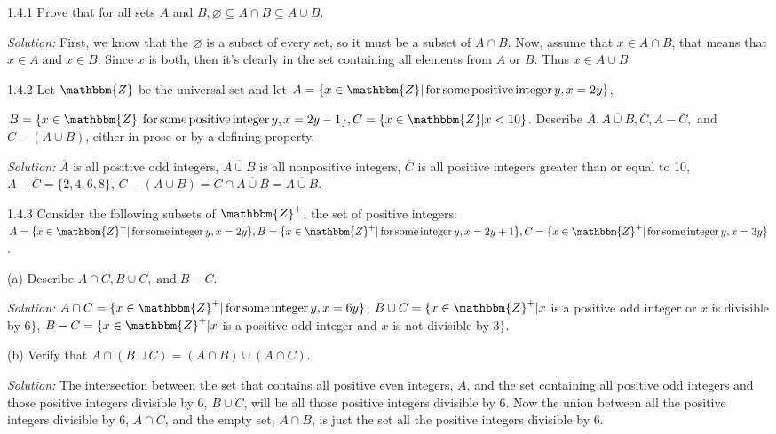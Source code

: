 \documentclass{letter}
\newcommand{\tmop}[1]{\ensuremath{\operatorname{#1}}}
\newcommand{\tmtextit}[1]{{\itshape{#1}}}
\begin{document}
1.4.1 Prove that for all sets $A$ and $B, \varnothing \subseteq A \cap B
\subseteq A \cup B$.

\tmtextit{Solution:} First, we know that the $\varnothing$ is a subset of
every set, so it must be a subset of $A \cap B$. Now, assume that $x \in A
\cap B$, that means that $x \in A \tmop{and} x \in B$. Since $x$ is both, then
it's clearly in the set containing all elements from $A$ or $B$. Thus $x \in A
\cup B$.

1.4.2 Let $\mathbbm{Z}$ be the universal set and let $A =\{x \in \mathbbm{Z}|
\tmop{for} \tmop{some} \tmop{positive} \tmop{integer} y, x = 2 y\}$,

$B =\{x \in \mathbbm{Z}| \tmop{for} \tmop{some} \tmop{positive} \tmop{integer}
y, x = 2 y - 1\}, C =\{x \in \mathbbm{Z}| x < 10\}$. Describe $\overline{A},
\overline{A \cup B}, \overline{C}, A - \overline{C},$ and $C - (A \cup B)$,
either in prose or by a defining property.

\tmtextit{Solution:} $\overline{A}$ is all positive odd integers, $\overline{A
\cup B}$ is all nonpositive integers, $\overline{C}$ is all positive integers
greater than or equal to 10, $A - \overline{C} =\{2, 4, 6, 8\}$, $C - (A \cup
B) = C \cap \overline{A \cup B} = \overline{A \cup B}$.

1.4.3 Consider the following subsets of $\mathbbm{Z}^+$, the set of positive
integers: $A =\{x \in \mathbbm{Z}^+ | \tmop{for} \tmop{some} \tmop{integer} y,
x = 2 y\}, B =\{x \in \mathbbm{Z}^+ | \tmop{for} \tmop{some} \tmop{integer} y,
x = 2 y + 1\}, C =\{x \in \mathbbm{Z}^+ | \tmop{for} \tmop{some}
\tmop{integer} y, x = 3 y\}$.

(a) Describe $A \cap C, B \cup C, \tmop{and} B - C$.

\tmtextit{Solution:} $A \cap C =\{x \in \mathbbm{Z}^+ | \tmop{for} \tmop{some}
\tmop{integer} y, x = 6 y\}$, $B \cup C =\{x \in \mathbbm{Z}^+ | x$ is a
positive odd integer or $x$ is divisible by $6\}$, $B - C =\{x \in
\mathbbm{Z}^+ | x$ is a positive odd integer and $x$ is not divisible by
$3\}$.

(b) Verify that $A \cap (B \cup C) = (A \cap B) \cup (A \cap C) .$

\tmtextit{Solution:} The intersection between the set that contains all
positive even integers, $A$, and the set containing all positive odd integers
and those positive integers divisible by 6, $B \cup C$, will be all those
positive integers divisible by 6. Now the union between all the positive
integers divisible by 6, $A \cap C$, and the empty set, $A \cap B$, is just
the set all the positive integers divisible by $6$.
\end{document}
